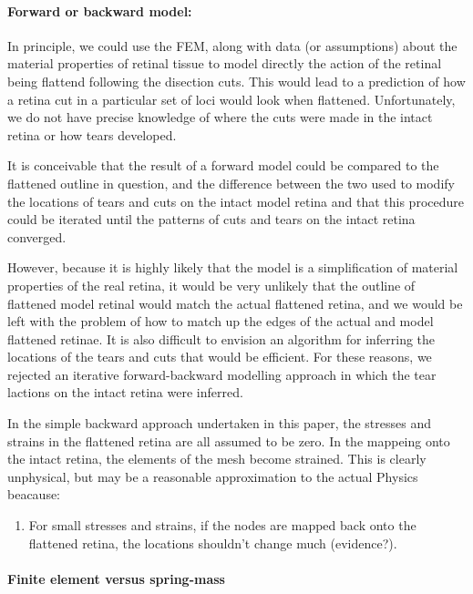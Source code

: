 \documentclass[10pt]{article}
\begin{document}
\paragraph{Forward or backward model:} 

In principle, we could use the FEM, along with data (or assumptions)
about the material properties of retinal tissue to model directly the
action of the retinal being flattend following the disection
cuts. This would lead to a prediction of how a retina cut in a
particular set of loci would look when flattened. Unfortunately, we do
not have precise knowledge of where the cuts were made in the intact
retina or how tears developed.

It is conceivable that the result of a forward model could be compared
to the flattened outline in question, and the difference between the
two used to modify the locations of tears and cuts on the intact model
retina and that this procedure could be iterated until the patterns of
cuts and tears on the intact retina converged.

However, because it is highly likely that the model is a
simplification of material properties of the real retina, it would be
very unlikely that the outline of flattened model retinal would match
the actual flattened retina, and we would be left with the problem of
how to match up the edges of the actual and model flattened
retinae. It is also difficult to envision an algorithm for inferring
the locations of the tears and cuts that would be efficient. For these
reasons, we rejected an iterative forward-backward modelling approach
in which the tear lactions on the intact retina were inferred.

In the simple backward approach undertaken in this paper, the stresses
and strains in the flattened retina are all assumed to be zero. In the
mappeing onto the intact retina, the elements of the mesh become
strained. This is clearly unphysical, but may be a reasonable
approximation to the actual Physics beacause:
\begin{enumerate}
\item For small stresses and strains, if the nodes are mapped back
  onto the flattened retina, the locations shouldn't change much
  (evidence?).
\end{enumerate}

\paragraph{Finite element versus spring-mass}
\label{fold-sphere:sec:finite-elem-vers}
\end{document}
